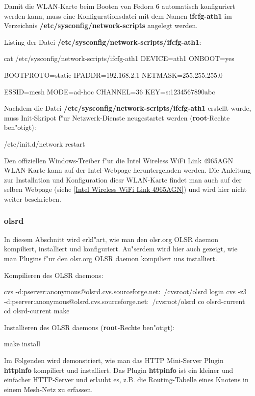 Damit die WLAN-Karte beim Booten von Fedora 6
automatisch konfiguriert werden kann, muss eine Konfigurationsdatei
mit dem Namen \textbf{ifcfg-ath1} im Verzeichnis
\textbf{/etc/sysconfig/network-scripts} angelegt werden.

Listing der Datei \textbf{/etc/sysconfig/network-scripts/ifcfg-ath1}:
\begin{shelllst}
cat /etc/sysconfig/network-scripts/ifcfg-ath1
DEVICE=ath1
ONBOOT=yes
			
BOOTPROTO=static
IPADDR=192.168.2.1
NETMASK=255.255.255.0
			
ESSID=mesh
MODE=ad-hoc
CHANNEL=36
KEY=s:1234567890abc
\end{shelllst}

Nachdem die Datei \textbf{/etc/sysconfig/network-scripts/ifcfg-ath1}
erstellt wurde, muss Init-Skripot f"ur Netzwerk-Dienste neugestartet
werden (\textbf{root}-Rechte ben"otigt):
\begin{shelllst}
/etc/init.d/network restart
\end{shelllst}

Den offiziellen Windows-Treiber f"ur die Intel Wireless WiFi Link 4965AGN
WLAN-Karte kann auf der Intel-Webpage heruntergeladen werden. Die Anleitung
zur Installation und Konfiguration diesr WLAN-Karte findet man auch
auf der selben Webpage (siehe \ref{Intel Wireless WiFi Link 4965AGN}) und
wird hier nicht weiter beschrieben.

\subsubsection{olsrd}

In diesem Abschnitt wird erkl"art, wie man den olsr.org OLSR daemon kompiliert,
installiert und konfiguriert. Au"serdem wird hier auch gezeigt, wie man
Plugins f"ur den olsr.org OLSR daemon kompiliert uns installiert.

Kompilieren des OLSR daemons:
\begin{shelllst}
cvs -d:pserver:anonymous@olsrd.cvs.sourceforge.net:\
	/cvsroot/olsrd login
cvs -z3 -d:pserver:anonymous@olsrd.cvs.sourceforge.net:\
	/cvsroot/olsrd co olsrd-current
cd olsrd-current
make
\end{shelllst}

Installieren des OLSR daemons (\textbf{root}-Rechte ben"otigt):
\begin{shelllst}
make install
\end{shelllst}

Im Folgenden wird demonstriert, wie man
das HTTP Mini-Server Plugin \textbf{httpinfo} kompiliert und installiert.
Das Plugin \textbf{httpinfo} ist ein kleiner und einfacher HTTP-Server und
erlaubt es, z.B. die Routing-Tabelle eines Knotens in einem Mesh-Netz
zu erfassen.

